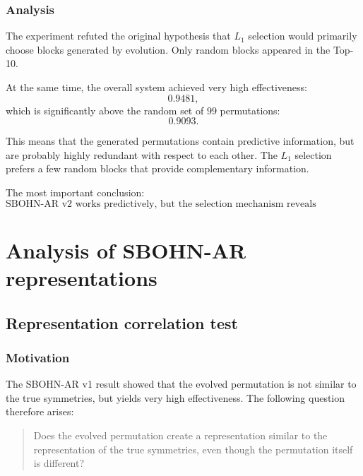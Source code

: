 \documentclass[11pt,a4paper]{report}
\begin{document}
\subsubsection{Analysis}

The experiment refuted the original hypothesis that $L_1$ selection would primarily choose blocks generated by evolution. Only random blocks appeared in the Top-10.

At the same time, the overall system achieved very high effectiveness:
\[
0.9481,
\]
which is significantly above the random set of $99$ permutations:
\[
0.9093.
\]

This means that the generated permutations contain predictive information, but are probably highly redundant with respect to each other. The $L_1$ selection prefers a few random blocks that provide complementary information.

The most important conclusion:
\[
\boxed{\text{SBOHN-AR v2 works predictively, but the selection mechanism reveals redundancy of the generated library.}}
\]



\section{Analysis of SBOHN-AR representations}\label{sec:sbohn_ar_analysis}

\subsection{Representation correlation test}

\subsubsection{Motivation}

The SBOHN-AR v1 result showed that the evolved permutation is not similar to the true symmetries, but yields very high effectiveness. The following question therefore arises:

\begin{quote}
Does the evolved permutation create a representation similar to the representation of the true symmetries, even though the permutation itself is different?
\end{quote}
\end{document}
